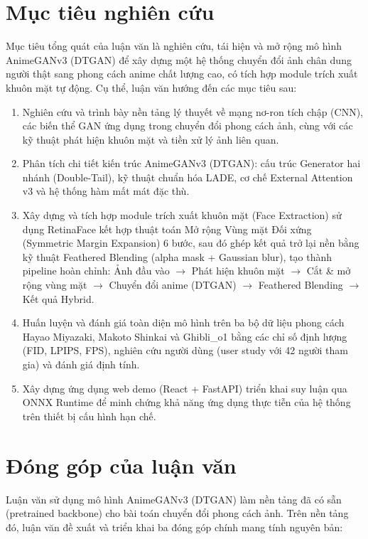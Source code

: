 \section*{Mục tiêu nghiên cứu}

Mục tiêu tổng quát của luận văn là nghiên cứu, tái hiện và mở rộng mô hình AnimeGANv3 (DTGAN) để xây dựng một hệ thống chuyển đổi ảnh chân dung người thật sang phong cách anime chất lượng cao, có tích hợp module trích xuất khuôn mặt tự động. Cụ thể, luận văn hướng đến các mục tiêu sau:

\begin{enumerate}
    \item Nghiên cứu và trình bày nền tảng lý thuyết về mạng nơ-ron tích chập (CNN), các biến thể GAN ứng dụng trong chuyển đổi phong cách ảnh, cùng với các kỹ thuật phát hiện khuôn mặt và tiền xử lý ảnh liên quan.
    \item Phân tích chi tiết kiến trúc AnimeGANv3 (DTGAN): cấu trúc Generator hai nhánh (Double-Tail), kỹ thuật chuẩn hóa LADE, cơ chế External Attention v3 và hệ thống hàm mất mát đặc thù.
    \item Xây dựng và tích hợp module trích xuất khuôn mặt (Face Extraction) sử dụng RetinaFace kết hợp thuật toán Mở rộng Vùng mặt Đối xứng (Symmetric Margin Expansion) 6 bước, sau đó ghép kết quả trở lại nền bằng kỹ thuật Feathered Blending (alpha mask + Gaussian blur), tạo thành pipeline hoàn chỉnh: Ảnh đầu vào $\rightarrow$ Phát hiện khuôn mặt $\rightarrow$ Cắt \& mở rộng vùng mặt $\rightarrow$ Chuyển đổi anime (DTGAN) $\rightarrow$ Feathered Blending $\rightarrow$ Kết quả Hybrid.
    \item Huấn luyện và đánh giá toàn diện mô hình trên ba bộ dữ liệu phong cách Hayao Miyazaki, Makoto Shinkai và Ghibli\_o1 bằng các chỉ số định lượng (FID, LPIPS, FPS), nghiên cứu người dùng (user study với 42 người tham gia) và đánh giá định tính.
    \item Xây dựng ứng dụng web demo (React + FastAPI) triển khai suy luận qua ONNX Runtime để minh chứng khả năng ứng dụng thực tiễn của hệ thống trên thiết bị cấu hình hạn chế.
\end{enumerate}

\section*{Đóng góp của luận văn}

Luận văn sử dụng mô hình AnimeGANv3 (DTGAN) \cite{Liu2024} làm nền tảng đã có sẵn (pretrained backbone) cho bài toán chuyển đổi phong cách ảnh. Trên nền tảng đó, luận văn đề xuất và triển khai ba đóng góp chính mang tính nguyên bản:

